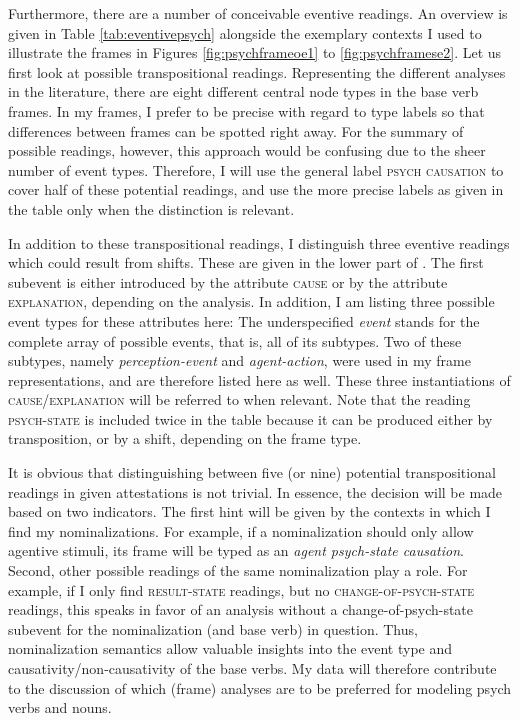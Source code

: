Furthermore, there are a number of conceivable eventive readings. An overview is given in Table \ref{tab:eventivepsych} alongside the exemplary contexts I used to illustrate the frames in Figures \ref{fig:psychframeoe1} to \ref{fig:psychframese2}.
Let us first look at possible transpositional readings. Representing the different analyses in the literature, there are eight different central node types in the base verb frames. In my frames, I prefer to be precise with regard to type labels so that differences between frames can be spotted right away. For the summary of possible readings, however, this approach would be confusing due to the sheer number of event types. Therefore, I will use the general label \textsc{psych causation} to cover half of these potential readings, and use the more precise labels as given in the table only when the distinction is relevant.\largerpage[-2]

In addition to these transpositional readings, I distinguish three eventive readings which could result from shifts. These are given in the lower part of .
The first subevent is either introduced by the attribute \textsc{cause} or by the attribute \textsc{explanation}, depending on the analysis. In addition, I am listing three possible event types for these attributes here: The underspecified \textit{event} stands for the complete array of possible events, that is, all of its subtypes. Two of these subtypes, namely \textit{perception-event} and \textit{agent-action}, were used in my frame representations, and are therefore listed here as well.
These three instantiations of \textsc{cause/explanation} will be referred to when relevant.
Note that the reading \textsc{psych-state} is included twice in the table because it can be produced either by transposition, or by a shift, depending on the frame type.

It is obvious that distinguishing between five (or nine) potential transpositional readings in given attestations is not trivial. In essence, the decision will be made based on two indicators. The first hint will be given by the contexts in which I find my nominalizations. For example, if a nominalization should only allow agentive stimuli, its frame will be typed as an \textit{agent psych-state causation}. Second, other possible readings of the same nominalization play a role. For example, if I only find \textsc{result-state} readings, but no \textsc{change-of-psych-state} readings, this speaks in favor of an analysis without a change-of-psych-state subevent for the nominalization (and base verb) in question.
Thus, nominalization semantics allow valuable insights into the event type and causativity/non-causativity of the base verbs. My data will therefore contribute to the discussion of which (frame) analyses are to be preferred for modeling psych verbs and nouns.

